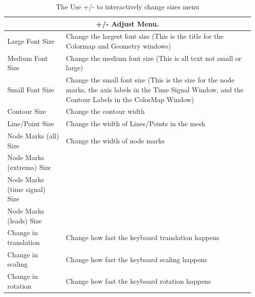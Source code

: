 \begin{table}[ht]
    \caption{The Use +/- to interactively change sizes menu}
  \begin{center}
    \begin{tabular}{|l|p{4in}|} \hline
      \multicolumn{2}{|c|}{\textbf{+/-  Adjust Menu.}} \\ \hline \hline
      Large Font Size & Change the largest font size (This is the title
    for the Colormap and Geometry windows) \\ 
      Medium Font Size & Change the medium font size (This is all text
    not small or large) \\ 
      Small Font Size & Change the small font size (This is the size for
    the node marks, the axis labels in the Time Signal Window, and the
    Contour Labels in the ColorMap Window) \\ 
      Contour Size & Change the contour width \\
      Line/Point Size & Change the width of Lines/Points in the mesh \\
      Node Marks (all) Size & Change the width of node marks \\
      Node Marks (extrema) Size & \\
      Node Marks (time signal) Size & \\
      Node Marks (leads) Size & \\
      Change in translation & Change how fast the keyboard translation
    happens \\ 
      Change in scaling & Change how fast the keyboard scaling happens \\
      Change in rotation & Change how fast the keyboard rotation happens
      \\ \hline 
    \end{tabular}
  \end{center}
\end{table}



